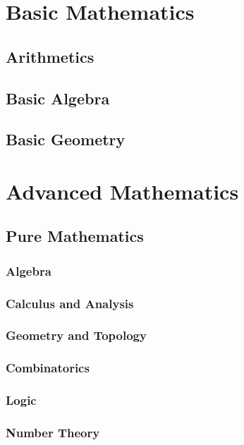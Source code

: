 \documentclass[a4paper]{book}
\begin{document}
\chapter{Basic Mathematics}
\section{Arithmetics}

\section{Basic Algebra}

\section{Basic Geometry}

\chapter{Advanced Mathematics}
\section{Pure Mathematics}
\subsection{Algebra}

\subsection{Calculus and Analysis}

\subsection{Geometry and Topology}

\subsection{Combinatorics}

\subsection{Logic}

\subsection{Number Theory}
\end{document}
